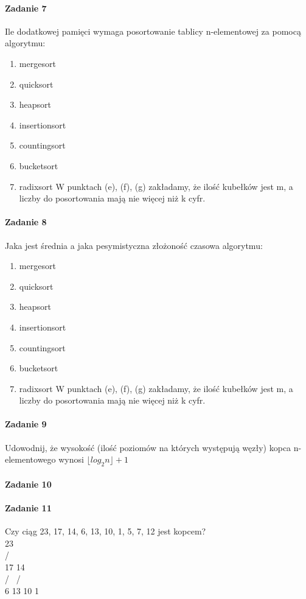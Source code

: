 \documentclass[18pt]{extarticle}
\begin{document}
\paragraph{Zadanie 7} Ile dodatkowej pamięci wymaga posortowanie tablicy n-elementowej za pomocą algorytmu: \\
\begin{enumerate}[label=\alph*.]
    \item mergesort
    \item quicksort
    \item heapsort
    \item insertionsort
    \item countingsort
    \item bucketsort
    \item radixsort
    W punktach (e), (f), (g) zakładamy, że ilość kubełków jest m, a liczby do posortowania mają nie więcej niż k cyfr.
\end{enumerate}

\paragraph{Zadanie 8} Jaka jest średnia a jaka pesymistyczna złożoność czasowa algorytmu: \\
\begin{enumerate}[label=\alph*]
    \item mergesort
    \item quicksort
    \item heapsort
    \item insertionsort
    \item countingsort
    \item bucketsort
    \item radixsort
    W punktach (e), (f), (g) zakładamy, że ilość kubełków jest m, a liczby do posortowania mają nie więcej niż k cyfr.
\end{enumerate}

\paragraph{Zadanie 9} Udowodnij, że wysokość (ilość poziomów na których występują węzły) kopca n-elementowego wynosi $\lfloor log_2 n \rfloor + 1$ \\


\paragraph{Zadanie 10}


\paragraph{Zadanie 11} Czy ciąg {23, 17, 14, 6, 13, 10, 1, 5, 7, 12} jest kopcem? \\
         23 \\
        /  \ \\
       17  14 \\
      / \  / \ \\
     6  13 10 1 \\
\end{document}
